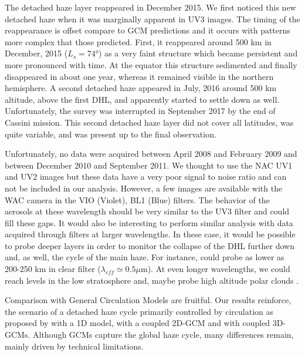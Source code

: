 The detached haze layer reappeared in December 2015. We first noticed this new detached haze when it was marginally
apparent in UV3 images.
The timing of the reappearance is offset compare to GCM predictions and it occurs with patterns more complex
that those predicted. First, it reappeared around 500 km in December, 2015 ($L_s =\ang{74}$) as a very faint
structure which became persistent and more pronounced with time.
At the equator this structure sedimented and finally disappeared in about one year, whereas it remained visible in the northern hemisphere.
A second detached haze appeared in July, 2016 around 500 km altitude, above the first DHL, and apparently started to settle down
as well. Unfortunately, the survey was interrupted in September 2017 by the end of Cassini mission. This second detached
haze layer did not cover all latitudes, was quite variable, and was present up to the final observation.

Unfortunately, no data were acquired between April 2008 and February 2009 and between December 2010 and September 2011.
We thought to use the NAC UV1 and UV2 images but these data have a very poor signal to noise ratio and
can not be included in our analysis.
However, a few images are available with the WAC camera in the VIO (Violet), BL1 (Blue) filters.
The behavior of the aerosols at these wavelength should be very similar to the UV3 filter and could fill these gaps.
It would also be interesting to perform similar analysis with data acquired through filters at larger wavelengths.
In these case, it would be possible to probe deeper layers in order to monitor the collapse of the DHL further
down and, as well, the cycle of the main haze. For instance, \cite{Rages1983} could probe as lower as 200-250 km
in clear filter ($\lambda_{eff} \simeq 0.5 \mu$m). At even longer wavelengths, we could reach levels in the low
stratosphere and, maybe probe high altitude polar clouds \citep{deKok2014,West2016}.

Comparison with General Circulation Models are fruitful. Our results reinforce, the scenario of a
detached haze cycle primarily controlled by circulation as proposed by \cite{Toon1992} with a 1D model, \cite{Rannou2002}
with a coupled 2D-GCM and \cite{Lebonnois2012, Larson2015} with coupled 3D-GCMs. Although GCMs capture the global
haze cycle, many differences remain, mainly driven by technical limitations.
